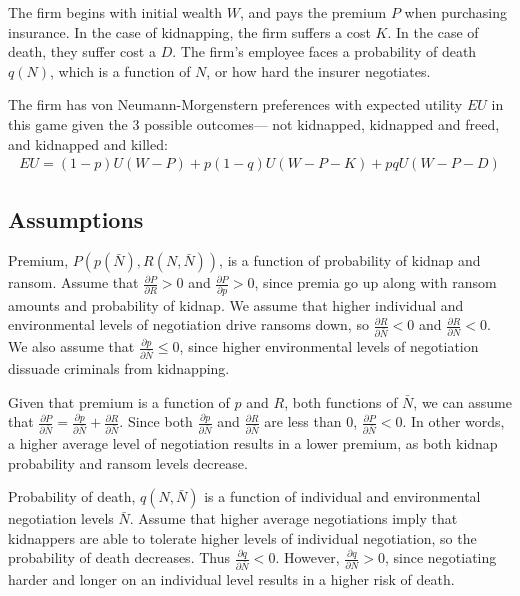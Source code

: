 \documentclass[12pt]{article}
\theoremstyle{plain}
\begin{document}
The firm begins with initial wealth $W$, and pays the premium $P$ when purchasing insurance. In the case of kidnapping, the firm suffers a cost $K$. In the case of death, they suffer cost a $D$. The firm's employee faces a probability of death $q(N)$, which is a function of $N$, or how hard the insurer negotiates. 

The firm has von Neumann-Morgenstern preferences with expected utility $EU$ in this game given the 3 possible outcomes--- not kidnapped, kidnapped and freed, and kidnapped and killed:
\begin{align*}
EU = (1-p)U(W-P) + p(1-q)U(W-P-K) + pqU(W-P-D)
\end{align*}

\subsection{Assumptions}

Premium, $P(p(\bar{N}), R(N, \bar{N}))$, is a function of probability of kidnap and ransom. Assume that $\frac{\partial P}{\partial R} > 0$ and $\frac{\partial P}{\partial p} > 0$, since premia go up along with ransom amounts and probability of kidnap. We assume that higher individual and environmental levels of negotiation drive ransoms down, so $\frac{\partial R}{\partial \bar{N}} < 0$ and $\frac{\partial R}{\partial N} < 0$. We also assume that $\frac{\partial p}{\partial \bar{N}} \leq 0$, since higher environmental levels of negotiation dissuade criminals from kidnapping. 

Given that premium is a function of $p$ and $R$, both functions of $\bar{N}$, we can assume that $\frac{\partial P}{\partial \bar{N}} = \frac{\partial p}{\partial \bar{N}} + \frac{\partial R}{\partial \bar{N}}$. Since both $\frac{\partial p}{\partial \bar{N}}$ and $\frac{\partial R}{\partial \bar{N}}$ are less than $0$, $\frac{\partial P}{\partial \bar{N}} < 0$. In other words, a higher average level of negotiation results in a lower premium, as both kidnap probability and ransom levels decrease.

Probability of death, $q(N, \bar{N})$ is a function of individual and environmental negotiation levels $\bar{N}$. Assume that higher average negotiations imply that kidnappers are able to tolerate higher levels of individual negotiation, so the probability of death decreases. Thus $\frac{\partial q}{\partial \bar{N}} < 0$. However, $\frac{\partial q}{\partial N} > 0$, since negotiating harder and longer on an individual level results in a higher risk of death.
\end{document}
